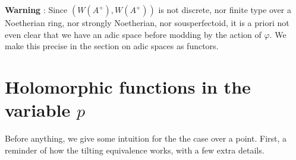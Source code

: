 \documentclass{article}
\begin{document}
\textbf{Warning} : 
Since $(W(A^+) , W(A^+))$ is not discrete,
nor finite type over a Noetherian ring, nor strongly Noetherian,
nor sousperfectoid,
it is a priori not even clear that we have an adic space
before modding by the action of $\varphi$.
We make this precise in the section on adic spaces as functors.

\section{Holomorphic functions in the variable $p$}

Before anything, we give some intuition for the the case over a point.
First, a reminder of how the tilting equivalence works,
with a few extra details.
\end{document}
